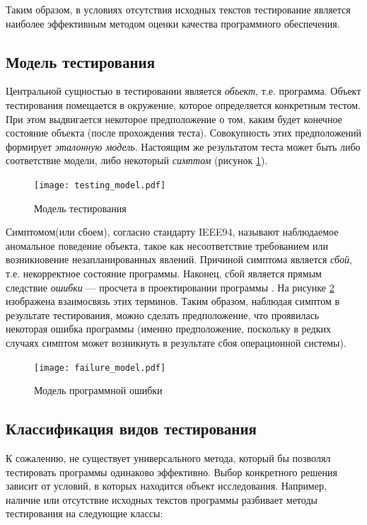 \documentclass[a4paper,14pt,href]{article}
\begin{document}
   Таким образом, в условиях отсутствия исходных текстов тестирование является наиболее эффективным методом оценки качества программного обеспечения.
\newpage
\subsection{Модель тестирования}
\label{TestingModel}
  Центральной сущностью в тестировании является \textit{объект}, т.е. программа. Объект тестирования помещается в окружение, которое определяется конкретным тестом. При этом выдвигается некоторое предположение о том, каким будет конечное состояние объекта (после прохождения теста). Совокупность этих предположений формирует \textit{эталонную модель}. Настоящим же результатом теста может быть либо соответствие модели, либо некоторый \textit{симптом} (рисунок \ref{fig:TestingModel}).

\begin{figure}[htbp]
\begin{center}
	\texttt{[image: testing\_model.pdf]}
    \caption{Модель тестирования}
    \label{fig:TestingModel}
\end{center}
\end{figure}

	Симптомом(или сбоем), согласно стандарту IEEE94, называют наблюдаемое аномальное поведение объекта, такое как несоответствие требованием или возникновение незапланированных явлений. Причиной симптома является \textit{сбой}, т.е. некорректное состояние программы. Наконец, сбой является прямым следствие \textit{ошибки} --- просчета в проектировании программы\cite{Ahin} \cite{TestingBlackBox}. На рисунке \ref{fig:FailureModel} изображена взаимосвязь этих терминов. Таким образом, наблюдая симптом в результате тестирования, можно сделать предположение, что проявилась некоторая ошибка программы (именно предположение, поскольку в редких случаях симптом может возникнуть в результате сбоя операционной системы).

\begin{figure}[htbp]
\begin{center}
	\texttt{[image: failure\_model.pdf]}
    \caption{Модель программной ошибки}
    \label{fig:FailureModel}
\end{center}
\end{figure}

\subsection{Классификация видов тестирования}
	К сожалению, не существует универсального метода, который бы позволял тестировать программы одинаково эффективно. Выбор конкретного решения зависит от условий, в которых находится объект исследования. Например, наличие или отсутствие исходных текстов программы разбивает методы тестирования на следующие классы:
\end{document}
